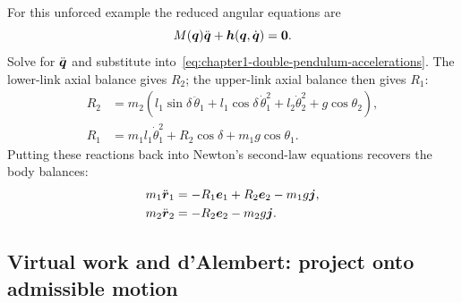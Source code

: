 \documentclass[../main.tex]{subfiles}
\begin{document}
For this unforced example the reduced angular equations are
\begin{equation}
M(\boldsymbol{q})\ddot{\boldsymbol{q}}+\boldsymbol{h}(\boldsymbol{q},\dot{\boldsymbol{q}})
=\boldsymbol{0}.
\label{eq:chapter1-lagrange-reduced-eom}
\end{equation}
Solve for $\ddot{\boldsymbol{q}}$ and substitute into~\eqref{eq:chapter1-double-pendulum-accelerations}. The lower-link axial balance gives $R_2$; the upper-link axial balance then gives $R_1$:
\begin{equation}
\begin{aligned}
R_2&=m_2\left(l_1\sin\delta\,\ddot\theta_1
+l_1\cos\delta\,\dot\theta_1^2+l_2\dot\theta_2^2+g\cos\theta_2\right),\\
R_1&=m_1l_1\dot\theta_1^2+R_2\cos\delta+m_1g\cos\theta_1.
\end{aligned}
\label{eq:chapter1-lagrange-reactions}
\end{equation}
Putting these reactions back into Newton's second-law equations recovers the body balances:
\begin{equation}
\begin{aligned}
m_1\ddot{\boldsymbol{r}}_1 &= -R_1\boldsymbol{e}_1+R_2\boldsymbol{e}_2-m_1g\boldsymbol{j},\\
m_2\ddot{\boldsymbol{r}}_2 &= -R_2\boldsymbol{e}_2-m_2g\boldsymbol{j}.
\end{aligned}
\label{eq:chapter1-double-pendulum-common-eom}
\end{equation}

\subsection{Virtual work and d'Alembert: project onto admissible motion}
\end{document}
